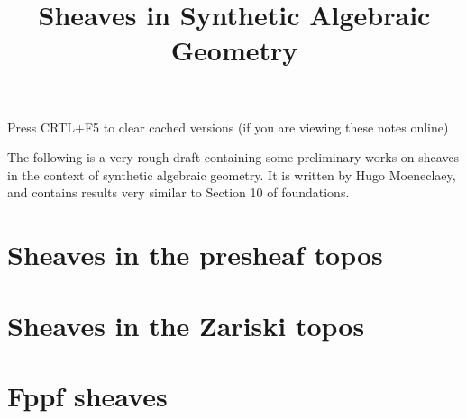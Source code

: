 \documentclass{../util/zariski}
\title{Sheaves in Synthetic Algebraic Geometry}
\begin{document}
\maketitle

\begin{center}
  \color{purple}
  \large{Press CRTL+F5 to clear cached versions}
  \large{(if you are viewing these notes online)}
\end{center}

The following is a very rough draft containing some preliminary works on sheaves in the context of synthetic algebraic geometry. It is written by Hugo Moeneclaey, and contains results very similar to Section 10 of foundations.

\tableofcontents

\section{Sheaves in the presheaf topos}


\section{Sheaves in the Zariski topos}


\section{Fppf sheaves}




\printindex

\printbibliography
\end{document}

